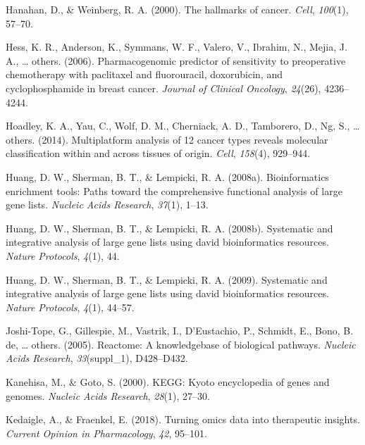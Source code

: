 \documentclass[12pt,twoside]{reedthesis}
\begin{document}
\leavevmode\hypertarget{ref-hanahan2000hallmarks}{}%
Hanahan, D., \& Weinberg, R. A. (2000). The hallmarks of cancer. \emph{Cell}, \emph{100}(1), 57--70.

\leavevmode\hypertarget{ref-hess2006pharmacogenomic}{}%
Hess, K. R., Anderson, K., Symmans, W. F., Valero, V., Ibrahim, N., Mejia, J. A., \ldots{} others. (2006). Pharmacogenomic predictor of sensitivity to preoperative chemotherapy with paclitaxel and fluorouracil, doxorubicin, and cyclophosphamide in breast cancer. \emph{Journal of Clinical Oncology}, \emph{24}(26), 4236--4244.

\leavevmode\hypertarget{ref-hoadley2014multiplatform}{}%
Hoadley, K. A., Yau, C., Wolf, D. M., Cherniack, A. D., Tamborero, D., Ng, S., \ldots{} others. (2014). Multiplatform analysis of 12 cancer types reveals molecular classification within and across tissues of origin. \emph{Cell}, \emph{158}(4), 929--944.

\leavevmode\hypertarget{ref-huang2008bioinformatics}{}%
Huang, D. W., Sherman, B. T., \& Lempicki, R. A. (2008a). Bioinformatics enrichment tools: Paths toward the comprehensive functional analysis of large gene lists. \emph{Nucleic Acids Research}, \emph{37}(1), 1--13.

\leavevmode\hypertarget{ref-huang2008systematic}{}%
Huang, D. W., Sherman, B. T., \& Lempicki, R. A. (2008b). Systematic and integrative analysis of large gene lists using david bioinformatics resources. \emph{Nature Protocols}, \emph{4}(1), 44.

\leavevmode\hypertarget{ref-huang2009systematic}{}%
Huang, D. W., Sherman, B. T., \& Lempicki, R. A. (2009). Systematic and integrative analysis of large gene lists using david bioinformatics resources. \emph{Nature Protocols}, \emph{4}(1), 44--57.

\leavevmode\hypertarget{ref-joshi2005reactome}{}%
Joshi-Tope, G., Gillespie, M., Vastrik, I., D'Eustachio, P., Schmidt, E., Bono, B. de, \ldots{} others. (2005). Reactome: A knowledgebase of biological pathways. \emph{Nucleic Acids Research}, \emph{33}(suppl\_1), D428--D432.

\leavevmode\hypertarget{ref-kanehisa2000kegg}{}%
Kanehisa, M., \& Goto, S. (2000). KEGG: Kyoto encyclopedia of genes and genomes. \emph{Nucleic Acids Research}, \emph{28}(1), 27--30.

\leavevmode\hypertarget{ref-kedaigle2018turning}{}%
Kedaigle, A., \& Fraenkel, E. (2018). Turning omics data into therapeutic insights. \emph{Current Opinion in Pharmacology}, \emph{42}, 95--101.
\end{document}
